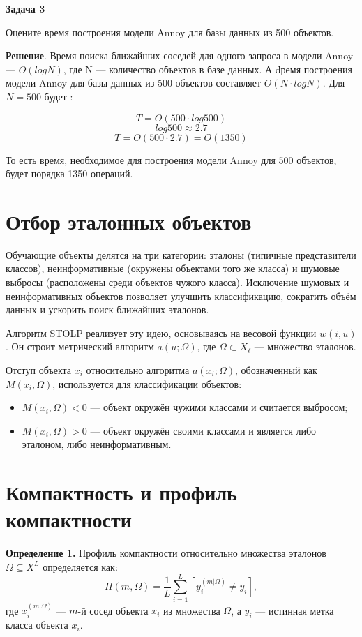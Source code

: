 \textbf{Задача 3}

Оцените время построения модели Annoy для базы данных из 500 объектов.

\textbf{Решение}. Время поиска ближайших соседей для одного запроса в модели Annoy — $O(logN)$, где N — количество объектов в базе данных. А dремя построения модели Annoy для базы данных из 500 объектов составляет $O(N\cdot logN)$. Для $N = 500$ будет :

\[
    T = O(500 \cdot log500) 
\]
\[
    log500 \approx 2.7 
\]
\[
    T = O(500 \cdot 2.7) = O(1350)
\]

То есть время, необходимое для построения модели Annoy для 500 объектов, будет порядка 1350 операций.

\section{Отбор эталонных объектов}
Обучающие объекты делятся на три категории: эталоны (типичные представители классов), неинформативные (окружены объектами того же класса) и шумовые выбросы (расположены среди объектов чужого класса). Исключение шумовых и неинформативных объектов позволяет улучшить классификацию, сократить объём данных и ускорить поиск ближайших эталонов.

Алгоритм STOLP реализует эту идею, основываясь на весовой функции \( w(i, u) \). Он строит метрический алгоритм \( a(u; \Omega) \), где \( \Omega \subset X_\ell \) — множество эталонов. 

Отступ объекта \( x_i \) относительно алгоритма \( a(x_i; \Omega) \), обозначенный как \( M(x_i, \Omega) \), используется для классификации объектов:
\begin{itemize}
    \item \( M(x_i, \Omega) < 0 \) — объект окружён чужими классами и считается выбросом;
    \item \( M(x_i, \Omega) > 0 \) — объект окружён своими классами и является либо эталоном, либо неинформативным.
\end{itemize}

\section{Компактность и профиль компактности}

\textbf{Определение 1.} Профиль компактности относительно множества эталонов \( \Omega \subseteq X^L \) определяется как:
\[
\Pi(m, \Omega) = \frac{1}{L} \sum_{i=1}^L \left[ y_i^{(m|\Omega)} \neq y_i \right],
\]
где \( x_i^{(m|\Omega)} \) — \( m \)-й сосед объекта \( x_i \) из множества \( \Omega \), а \( y_i \) — истинная метка класса объекта \( x_i \).


